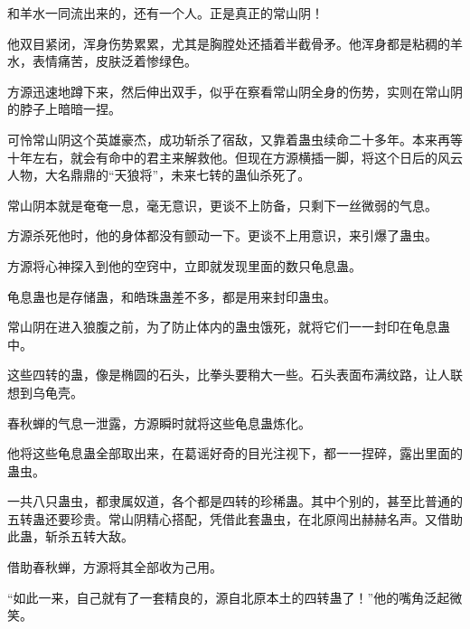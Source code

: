 \begin{this_body}
和羊水一同流出来的，还有一个人。正是真正的常山阴！

他双目紧闭，浑身伤势累累，尤其是胸膛处还插着半截骨矛。他浑身都是粘稠的羊水，表情痛苦，皮肤泛着惨绿色。

方源迅速地蹲下来，然后伸出双手，似乎在察看常山阴全身的伤势，实则在常山阴的脖子上暗暗一捏。

可怜常山阴这个英雄豪杰，成功斩杀了宿敌，又靠着蛊虫续命二十多年。本来再等十年左右，就会有命中的君主来解救他。但现在方源横插一脚，将这个日后的风云人物，大名鼎鼎的“天狼将”，未来七转的蛊仙杀死了。

常山阴本就是奄奄一息，毫无意识，更谈不上防备，只剩下一丝微弱的气息。

方源杀死他时，他的身体都没有颤动一下。更谈不上用意识，来引爆了蛊虫。

方源将心神探入到他的空窍中，立即就发现里面的数只龟息蛊。

龟息蛊也是存储蛊，和皓珠蛊差不多，都是用来封印蛊虫。

常山阴在进入狼腹之前，为了防止体内的蛊虫饿死，就将它们一一封印在龟息蛊中。

这些四转的蛊，像是椭圆的石头，比拳头要稍大一些。石头表面布满纹路，让人联想到乌龟壳。

春秋蝉的气息一泄露，方源瞬时就将这些龟息蛊炼化。

他将这些龟息蛊全部取出来，在葛谣好奇的目光注视下，都一一捏碎，露出里面的蛊虫。

一共八只蛊虫，都隶属奴道，各个都是四转的珍稀蛊。其中个别的，甚至比普通的五转蛊还要珍贵。常山阴精心搭配，凭借此套蛊虫，在北原闯出赫赫名声。又借助此蛊，斩杀五转大敌。

借助春秋蝉，方源将其全部收为己用。

“如此一来，自己就有了一套精良的，源自北原本土的四转蛊了！”他的嘴角泛起微笑。

\end{this_body}

